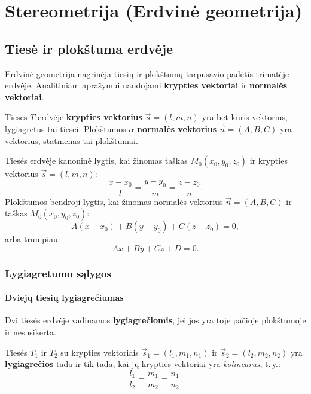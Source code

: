 \chapter{Stereometrija (Erdvinė geometrija)}

\section{Tiesė ir plokštuma erdvėje}

Erdvinė geometrija nagrinėja tiesių ir plokštumų tarpusavio padėtis trimatėje erdvėje.
Analitiniam aprašymui naudojami \textbf{krypties vektoriai} ir \textbf{normalės vektoriai}.

\begin{definition}
Tiesės $T$ erdvėje \textbf{krypties vektorius} $\vec{s} = (l, m, n)$ yra bet kuris
vektorius, lygiagretus tai tiesei. Plokštumos $\alpha$ \textbf{normalės vektorius}
$\vec{n} = (A, B, C)$ yra vektorius, statmenas tai plokštumai.
\end{definition}

Tiesės erdvėje kanoninė lygtis, kai žinomas taškas $M_0(x_0, y_0, z_0)$ ir
krypties vektorius $\vec{s} = (l, m, n)$:
\[
  \frac{x - x_0}{l} = \frac{y - y_0}{m} = \frac{z - z_0}{n}.
\]
Plokštumos bendroji lygtis, kai žinomas normalės vektorius $\vec{n} = (A, B, C)$
ir taškas $M_0(x_0, y_0, z_0)$:
\[
  A(x - x_0) + B(y - y_0) + C(z - z_0) = 0,
\]
arba trumpiau:
\[
  Ax + By + Cz + D = 0.
\]

\subsection{Lygiagretumo sąlygos}

\subsubsection*{Dviejų tiesių lygiagrečiumas}

\begin{definition}
Dvi tiesės erdvėje vadinamos \textbf{lygiagrečiomis}, jei jos yra toje pačioje
plokštumoje ir nesusikerta.
\end{definition}

\begin{theorem}
Tiesės $T_1$ ir $T_2$ su krypties vektoriais $\vec{s}_1 = (l_1, m_1, n_1)$ ir
$\vec{s}_2 = (l_2, m_2, n_2)$ yra \textbf{lygiagrečios} tada ir tik tada, kai
jų krypties vektoriai yra \emph{kolinearūs}, t.\,y.:
\[
  \frac{l_1}{l_2} = \frac{m_1}{m_2} = \frac{n_1}{n_2}.
\]
\end{theorem}

